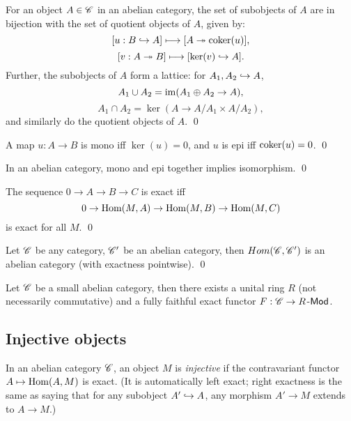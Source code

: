 \documentclass[11pt]{amsart}
\begin{document}
\begin{prop}
    For an object $A\in \mathscr{C}$ in an abelian category, the set of subobjects of $A$ are in bijection with the set of quotient objects of $A$, given by:
    \[[u:B\hookrightarrow A] \longmapsto [A\twoheadrightarrow \operatorname{coker}(u)],\]
    \[[v:A\twoheadrightarrow B] \longmapsto [\ker(v) \hookrightarrow A].\]
    Further, the subobjects of $A$ form a lattice: for $A_1,A_2\hookrightarrow A$,
    \[A_1\cup A_2 = \operatorname{im}(A_1\oplus A_2 \to A),\]
    \[A_1\cap A_2 = \ker(A\to A/A_1 \times A/A_2),\]
    and similarly do the quotient objects of $A$. \qed
\end{prop}

\begin{prop}
    A map $u:A\to B$ is mono iff $\ker(u) = 0$, and $u$ is epi iff $\operatorname{coker}(u) = 0$. \qed
\end{prop}

\begin{prop}
    In an abelian category, mono and epi together implies isomorphism. \qed
\end{prop}


\begin{prop}
    The sequence $0\to A\to B\to C$ is exact iff 
    \[0\to \operatorname{Hom}(M,A) \to \operatorname{Hom}(M,B)\to \operatorname{Hom}(M,C)\] is exact for all $M$. \qed
\end{prop}

\begin{prop}
    Let $\mathscr{C}$ be any category, $\mathscr{C}'$ be an abelian category, then $Hom(\mathscr{C}, \mathscr{C}')$ is an abelian category (with exactness pointwise). \qed
\end{prop}

\begin{thm}
    Let $\mathscr{C}$ be a small abelian category, then there exists a unital ring $R$ (not necessarily commutative) and a fully faithful exact functor $F: \mathscr{C}\to R$-$\mathsf{Mod}$.
\end{thm}



\subsection{Injective objects}

\begin{defn}
    In an abelian category $\mathscr{C}$, an object $M$ is \emph{injective} if the contravariant functor $A\mapsto \operatorname{Hom}(A,M)$ is exact. (It is automatically left exact; right exactness is the same as saying that for any subobject $A'\hookrightarrow A$, any morphism $A'\to M$ extends to $A\to M$.)
\end{defn}
\end{document}
